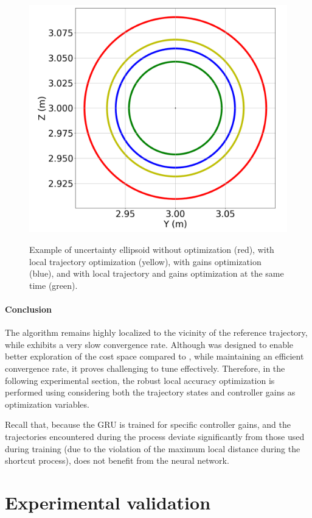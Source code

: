 \begin{figure} [h!]
    \centering
    {\includegraphics[width=0.4\linewidth]{figures/robust_accurate/accuracy_opti.png} }%
    \caption{Example of uncertainty ellipsoid without optimization (red), with local trajectory optimization (yellow), with gains optimization (blue), and with local trajectory and gains optimization at the same time (green).}%
    \label{fig: Acc opti}%
\end{figure}

\paragraph{Conclusion}

The  algorithm remains highly localized to the vicinity of the reference trajectory, while  exhibits a very slow convergence rate.
Although  was designed to enable better exploration of the cost space compared to , while maintaining an efficient convergence rate, it proves challenging to tune effectively.
Therefore, in the following experimental section, the robust local accuracy optimization is performed using  considering both the trajectory states and controller gains as optimization variables.

Recall that, because the GRU is trained for specific controller gains, and the trajectories encountered during the  process deviate significantly from those used during training (due to the violation of the maximum local distance during the shortcut process),  does not benefit from the neural network.

\section{Experimental validation} \label{sec:Experimental}

